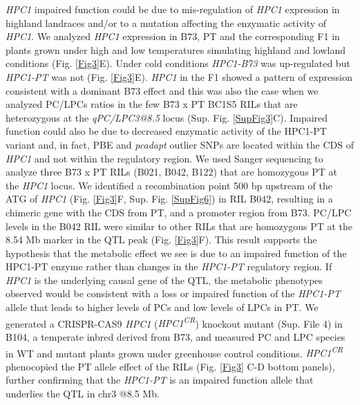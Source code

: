 \documentclass[9pt,twocolumn,twoside,lineno]{BioRxiv}
\begin{document}
\textit{HPC1} impaired function could be due to mis-regulation of \textit{HPC1} expression in highland landraces and/or to a mutation affecting the enzymatic activity of \textit{HPC1}. 
We analyzed \textit{HPC1} expression in B73, PT and the corresponding F1 in plants grown under high and low temperatures simulating highland and lowland conditions (Fig. \ref{Fig3}E). 
Under cold conditions \textit{HPC1-B73} was up-regulated but \textit{HPC1-PT} was not (Fig. \ref{Fig3}E). 
\textit{HPC1} in the F1 showed a pattern of expression consistent with a dominant B73 effect and this was also the case when we analyzed PC/LPCs ratios in the few B73 x PT BC1S5 RILs that are heterozygous at the \textit{qPC/LPC3@8.5} locus (Sup. Fig. \ref{SupFig3}C).
Impaired function could also be due to decreased enzymatic activity of the HPC1-PT variant and, in fact, PBE and \textit{pcadapt} outlier SNPs are located within the CDS of \textit{HPC1} and not within the regulatory region. 
We used Sanger sequencing to analyze three B73 x PT RILs (B021, B042, B122) that are homozygous PT at the \textit{HPC1} locus.
We identified a recombination point 500 bp upstream of the ATG of \textit{HPC1} (Fig. \ref{Fig3}F, Sup. Fig. \ref{SupFig6}) in RIL B042, resulting in a chimeric gene with the CDS from PT, and a promoter region from B73.
PC/LPC levels in the B042 RIL were similar to other RILs that are homozygous PT at the 8.54 Mb marker in the QTL peak (Fig. \ref{Fig3}F). 
This result supports the hypothesis that the metabolic effect we see is due to an impaired function of the HPC1-PT enzyme rather than changes in the \textit{HPC1-PT} regulatory region.
If \textit{HPC1} is the underlying causal gene of the QTL, the metabolic phenotypes observed would be consistent with a loss or impaired function of the \textit{HPC1-PT} allele that leads to higher levels of PCs and low levels of LPCs in PT. 
We generated a CRISPR-CAS9 \textit{HPC1} (\textit{HPC1\textsuperscript{CR}}) knockout mutant (Sup. File 4) in B104, a temperate inbred derived from B73, and measured PC and LPC species in WT and mutant plants grown under greenhouse control conditions. 
\textit{HPC1\textsuperscript{CR}} phenocopied the PT allele effect of the RILs (Fig. \ref{Fig3} C-D bottom panels), further confirming that the \textit{HPC1-PT} is an impaired function allele that underlies the QTL in chr3 @8.5 Mb. 
\end{document}
